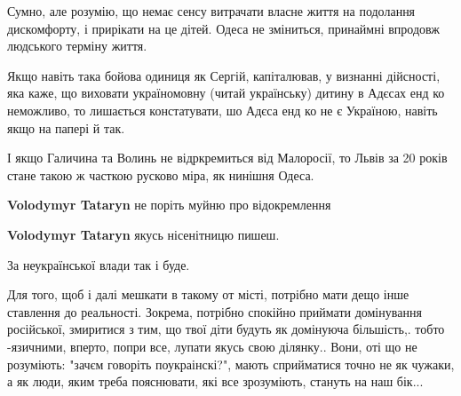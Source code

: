 \begin{itemize}
Сумно, але розумію, що немає сенсу витрачати власне життя на подолання
дискомфорту, і прирікати на це дітей. Одеса не зміниться, принаймні впродовж
людського терміну життя.


 

Якщо навіть така бойова одиниця як Сергій, капіталював, у визнанні дійсності,
яка каже, що виховати україномовну (читай українську) дитину в Адєсах енд ко
неможливо, то лишається констатувати, шо Адєса енд ко не є Україною, навіть
якщо на папері й так.

І якщо Галичина та Волинь не відркремиться від Малоросії, то Львів за 20 років
стане такою ж часткою русково міра, як нинішня Одеса.

\begin{itemize}
 
\textbf{Volodymyr Tataryn} не поріть муйню про відокремлення

 
\textbf{Volodymyr Tataryn} якусь нісенітницю пишеш.

 
За неукраїнської влади так і буде.

 

Для того, щоб і далі мешкати в такому от місті, потрібно мати дещо інше
ставлення до реальності. Зокрема, потрібно спокійно приймати домінування
російської, змиритися з тим, що твої діти будуть як домінуюча більшість,. тобто
-язичними, вперто, попри все, лупати якусь свою ділянку.. Вони, оті що не
розуміють: "зачєм говоріть поукраінскі?", мають сприйматися точно не як чужаки,
а як люди, яким треба пояснювати, які все зрозуміють, стануть на наш бік... 


\end{itemize}
\end{itemize}
